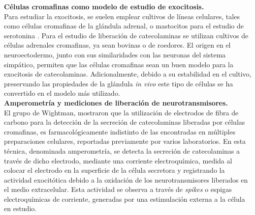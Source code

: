 \documentclass[twocolumn]{article}
\begin{document}
{\bf Células cromafinas como modelo de estudio de exocitosis.\\}
Para estudiar la exocitosis, se suelen emplear cultivos de líneas celulares\citep{O'Neill-1994}, tales como células cromafinas de la glándula adrenal\citep{bader2002exocytosis,wightman1991temporally},  o mastocitos para el estudio de serotonina\citep{reynier1997ne} . 
Para el estudio de liberación de catecolaminas se utilizan cultivos de células adrenales cromafinas, ya sean bovinas o de roedores. El origen en el neuroectodermo, junto con sus similaridades con las neuronas del sistema simpático, permiten que las células cromafinas sean un buen modelo para la exocitosis de catecolaminas.  Adicionalmente, debido a su estabilidad en el cultivo, preservando  las propiedades de la glándula \textit{in vivo} este tipo de células se ha convertido en el modelo más utilizado\citep{bader2002exocytosis,leszczyszyn1991secretion,wightman1991temporally}. \\
{\bf Amperometría y mediciones de liberación de neurotransmisores.\\}
El grupo de Wightman\citep{leszczyszyn1990nicotinic,leszczyszyn1991secretion, mosharov2005analysis}, mostraron que la utilización de electrodos de fibra de carbono para la detección de la secreción de catecolaminas liberadas por células cromafinas, es farmacológicamente indistinto de las encontradas en múltiples preparaciones celulares, reportadas previamente por varios laboratorios\citep{phillips1983visualization,viveros1969quantal}.  En esta técnica, denominada amperometría, se detecta la secreción de catecolaminas a través de dicho electrodo,  mediante una corriente electroquímica, medida al colocar el electrodo en la superficie de la célula secretora y registrando  la  actividad exocitótica debido a la oxidación de los neurotransmisores liberados en el medio extracelular.  Esta actividad se observa a través de \textit{spikes} o espigas electroquímicas de corriente, generadas por una estimulación externa a la célula en estudio.
\end{document}
